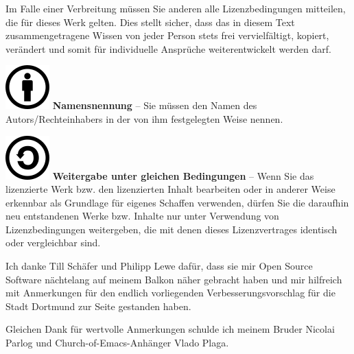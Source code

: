 \documentclass[a4paper]{article}
\newcommand\textstyleStrongEmphasis[1]{\textbf{#1}}
\begin{document}
{
Im Falle einer Verbreitung m\"ussen Sie anderen alle Lizenzbedingungen
mitteilen, die f\"ur dieses Werk gelten. Dies stellt sicher, dass das
in diesem Text zusammengetragene Wissen von jeder Person stets frei
vervielf\"altigt, kopiert, ver\"andert und somit f\"ur individuelle
Anspr\"uche weiterentwickelt werden darf.}


\bigskip

{

\includegraphics[width=0.6665in,height=0.6665in]{freiesoftwaredortmund-img4.png}
\textstyleStrongEmphasis{Namensnennung} -- Sie m\"ussen den Namen des
Autors/Rechteinhabers in der von ihm festgelegten Weise nennen.}


\bigskip

{

\includegraphics[width=0.6665in,height=0.6665in]{freiesoftwaredortmund-img5.png}
\textstyleStrongEmphasis{Weitergabe unter gleichen Bedingungen} -- Wenn
Sie das lizenzierte Werk bzw. den lizenzierten Inhalt bearbeiten oder
in anderer Weise erkennbar als Grundlage f\"ur eigenes Schaffen
verwenden, d\"urfen Sie die daraufhin neu entstandenen Werke bzw.
Inhalte nur unter Verwendung von Lizenzbedingungen weitergeben, die mit
denen dieses Lizenzvertrages identisch oder vergleichbar sind.}



\bigskip


\bigskip

{
Ich danke Till Sch\"afer und Philipp Lewe daf\"ur, dass sie mir Open
Source Software n\"achtelang auf meinem Balkon n\"aher gebracht haben
und mir hilfreich mit Anmerkungen f\"ur den endlich vorliegenden
Verbesserungsvorschlag f\"ur die Stadt Dortmund zur Seite gestanden
haben.}

{
Gleichen Dank f\"ur wertvolle Anmerkungen schulde ich meinem Bruder
Nicolai Parlog und Church-of-Emacs-Anh\"anger Vlado Plaga.}
\end{document}
